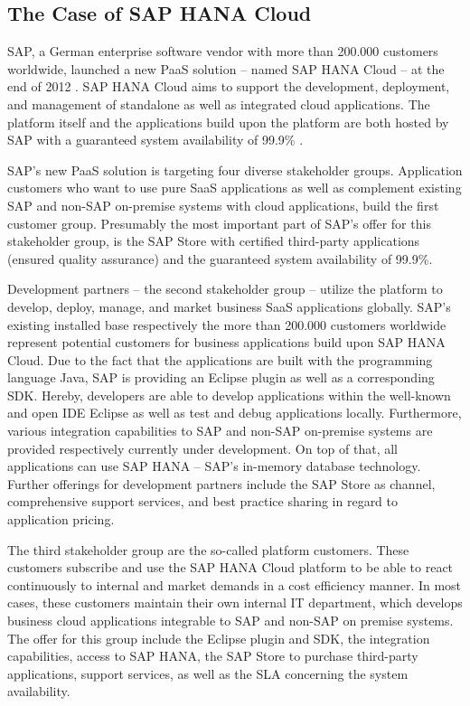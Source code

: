 \newpage


\subsection{The Case of SAP HANA Cloud}\label{ch:sota:sap}

SAP, a German enterprise software vendor with more than 200.000 customers worldwide, launched a new \ac{PaaS} solution -- named SAP HANA Cloud -- at the end of 2012 \citep{SAP2013b,SAP2013a}. SAP HANA Cloud aims to support the development, deployment, and management of standalone as well as integrated cloud applications. The platform itself and the applications build upon the platform are both hosted by SAP with a guaranteed system availability of 99.9\% \citep{SAP2013b}.

SAP's new \ac{PaaS} solution is targeting four diverse stakeholder groups. Application customers who want to use pure \ac{SaaS} applications as well as complement existing SAP and non-SAP on-premise systems with cloud applications, build the first customer group. Presumably the most important part of SAP's offer for this stakeholder group, is the SAP Store with certified third-party applications (ensured quality assurance) and the guaranteed system availability of 99.9\%.

Development partners -- the second stakeholder group -- utilize the platform to develop, deploy, manage, and market business \ac{SaaS} applications globally. SAP's existing installed base respectively the more than 200.000 customers worldwide represent potential customers for business applications build upon SAP HANA Cloud. Due to the fact that the applications are built with the programming language Java, SAP is providing an Eclipse plugin as well as a corresponding \ac{SDK}. Hereby, developers are able to develop applications within the well-known and open \ac{IDE} Eclipse as well as test and debug applications locally. Furthermore, various integration capabilities to SAP and non-SAP on-premise systems are provided respectively currently under development. On top of that, all applications can use SAP HANA -- SAP's in-memory database technology. Further offerings for development partners include the SAP Store as channel, comprehensive support services, and best practice sharing in regard to application pricing.

The third stakeholder group are the so-called platform customers. These customers subscribe and use the SAP HANA Cloud platform to be able to react continuously to internal and market demands in a cost efficiency manner. In most cases, these customers maintain their own internal \ac{IT} department, which develops business cloud applications integrable to SAP and non-SAP on premise systems. The offer for this group include the Eclipse plugin and \ac{SDK}, the integration capabilities, access to SAP HANA, the SAP Store to purchase third-party applications, support services, as well as the \ac{SLA} concerning the system availability.

